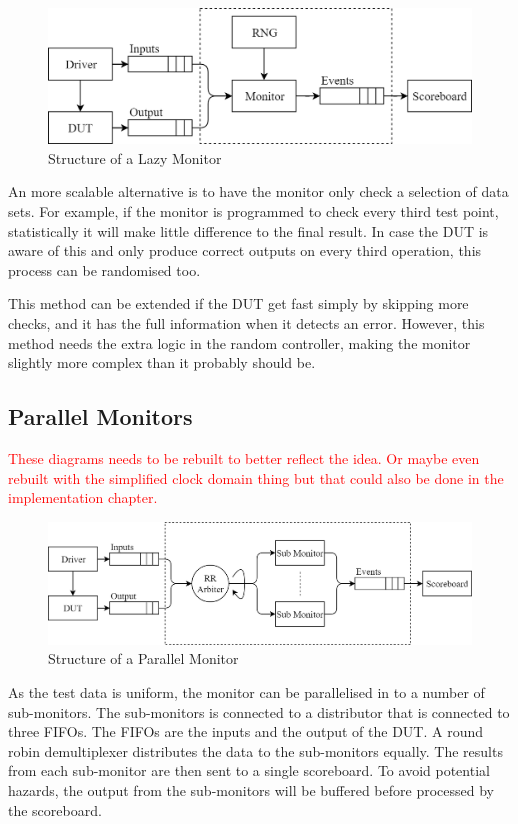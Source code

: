 \begin{figure}[H]
  \centering
  \includegraphics[width=12cm]{img/LazMon}
  \caption{Structure of a Lazy Monitor}
  \label{LazMon}
\end{figure}

An more scalable alternative is to have the monitor only check a selection of data sets.
For example, if the monitor is programmed to check every third test point, statistically it will make little difference to the final result.
In case the DUT is aware of this and only produce correct outputs on every third operation, this process can be randomised too.

This method can be extended if the DUT get fast simply by skipping more checks, and it has the full information when it detects an error.
However, this method needs the extra logic in the random controller, making the monitor slightly more complex than it probably should be.

\subsection{Parallel Monitors}

\textcolor{red}{These diagrams needs to be rebuilt to better reflect the idea. Or maybe even rebuilt with the simplified clock domain thing but that could also be done in the implementation chapter.}

\begin{figure}[H]
  \centering
  \includegraphics[width=15cm]{img/ParMon}
  \caption{Structure of a Parallel Monitor}
  \label{ParMon}
\end{figure}

As the test data is uniform, the monitor can be parallelised in to a number of sub-monitors.
The sub-monitors is connected to a distributor that is connected to three FIFOs.
The FIFOs are the inputs and the output of the DUT.
A round robin demultiplexer distributes the data to the sub-monitors equally.
The results from each sub-monitor are then sent to a single scoreboard.
To avoid potential hazards, the output from the sub-monitors will be buffered before processed by the scoreboard.

